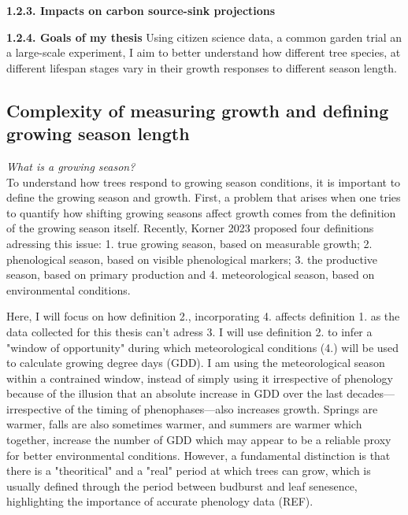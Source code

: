 \documentclass{article}
\begin{document}
\textbf{1.2.3. Impacts on carbon source-sink projections} 

\textbf{1.2.4. Goals of my thesis} 
Using citizen science data, a common garden trial an a large-scale experiment, I aim to better understand how different tree species, at different lifespan stages vary in their growth responses to different season length. 

\subsection{Complexity of measuring growth and defining growing season length}
\textit{What is a growing season?} \\
To understand how trees respond to growing season conditions, it is important to define the growing season and growth.
First, a problem that arises when one tries to quantify how shifting growing seasons affect growth comes from the definition of the growing season itself. Recently, Korner 2023 proposed four definitions adressing this issue: 1. true growing season, based on measurable growth; 2. phenological season, based on visible phenological markers; 3. the productive season, based on primary production and 4. meteorological season, based on environmental conditions.

Here, I will focus on how definition 2., incorporating 4. affects definition 1. as the data collected for this thesis can't adress 3. I will use definition 2. to infer a "window of opportunity" during which meteorological conditions (4.) will be used to calculate growing degree days (GDD). I am using the meteorological season within a contrained window, instead of simply using it irrespective of phenology because of the illusion that an absolute increase in GDD over the last decades---irrespective of the timing of phenophases---also increases growth. Springs are warmer, falls are also sometimes warmer, and summers are warmer which together, increase the number of GDD which may appear to be a reliable proxy for better environmental conditions. However, a fundamental distinction is that there is a "theoritical" and a "real" period at which trees can grow, which is usually defined through the period between budburst and leaf senesence, highlighting the importance of accurate phenology data (REF).
\end{document}
